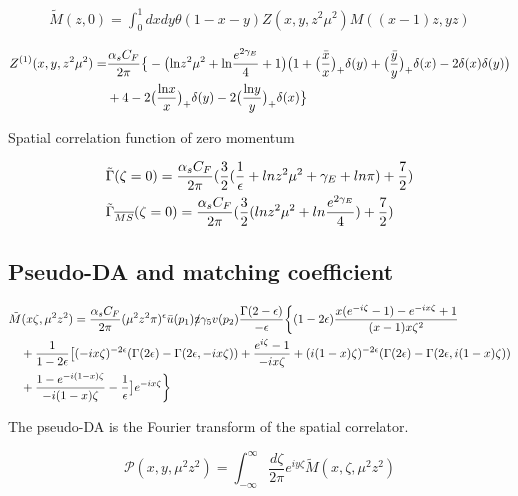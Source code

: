 \documentclass{article}
\begin{document}
\begin{align}{}
        \tilde{M}(z,0)=\int_{0}^{1} dxdy\theta(1-x-y) Z(x,y,z^2\mu^2) M((x-1)z,yz)
\end{align}


 \begin{align}{}
 Z^{(1)}(x,y,z^2\mu^2)=&\frac{\alpha_s C_F}{2\pi}\big\{-\big(\text{ln}z^2\mu^2+\text{ln}\frac{e^{2 \gamma_E}}{4}+1\big)\big(1+\big(\frac{\bar{x}}{x}\big)_+\delta(y)+\big(\frac{\bar{y}}{y}\big)_+\delta(x)-2\delta(x)\delta(y)\big)\notag\\
 &+4-2\big(\frac{\text{ln}x}{x}\big)_+\delta(y)-2\big(\frac{\text{ln}y}{y}\big)_+\delta(x)\big\}
\end{align}

Spatial correlation function of zero momentum


\begin{align}{}
    &\tilde{\Gamma}(\zeta=0) =\frac{\alpha_s C_F}{2\pi} (\frac{3}{2}(\frac{1}{\epsilon}+ln z^2\mu^2+\gamma_E +ln\pi)+\frac{7}{2})\notag\\
    &\tilde{\Gamma}_{\overline{MS}}(\zeta=0) =\frac{\alpha_s C_F}{2\pi} (\frac{3}{2}(ln z^2\mu^2+ln\frac{e^{2\gamma_E}}{4})+\frac{7}{2})\notag\\	
\end{align} 

\subsection{Pseudo-DA and matching coefficient}

\begin{align}{}
    &\tilde{M}(x\zeta,\mu^2 z^2)=\frac{\alpha_s C_F}{2\pi} (\mu^2 z^2 \pi)^\epsilon \bar{u}(p_1) \slashed{\text{z}} \gamma_5 v(p_2) \frac{\Gamma(2-\epsilon)}{-\epsilon} \bigg\{ (1-2\epsilon) \frac{x(e^{-i\zeta}-1)-e^{-ix\zeta}+1}{(x-1)x\zeta^2}\notag\\
    &\quad +\frac{1}{1-2\epsilon}\big[ (-i x\zeta)^{-2\epsilon}(\Gamma(2\epsilon)-\Gamma(2\epsilon,-i x\zeta))+\frac{e^{i \zeta}-1}{-ix\zeta}+(i (1-x)\zeta)^{-2\epsilon}(\Gamma(2\epsilon)-\Gamma(2\epsilon,i(1-x)\zeta))\notag\\
    & \quad +\frac{1-e^{-i (1-x)\zeta}}{-i(1-x)\zeta}-\frac{1}{\epsilon}  \big]e^{-i x \zeta}  \bigg \} \notag\\
\end{align}


The pseudo-DA is the Fourier transform of the spatial correlator. 

\begin{equation}
   \mathcal{P}(x,y,\mu^2z^2)= \int_{-\infty}^{\infty} \frac{d\zeta}{2\pi}e^{iy\zeta}\tilde{M}(x,\zeta,\mu^2 z^2)
\end{equation}
\end{document}
